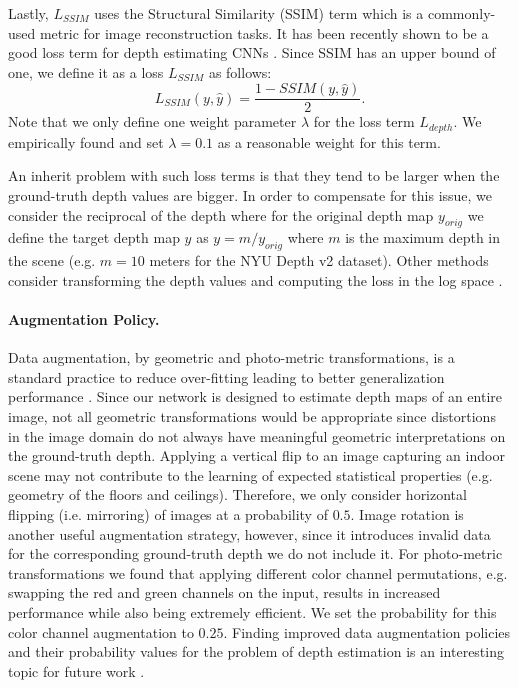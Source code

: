 \documentclass[10pt,twocolumn,letterpaper]{article}
\begin{document}
Lastly, $L_{SSIM}$ uses the Structural Similarity (SSIM) \cite{Wang2004SSIM} term which is a commonly-used metric for image reconstruction tasks. It has been recently shown to be a good loss term for depth estimating CNNs \cite{Godard2017}. Since SSIM has an upper bound of one, we define it as a loss $L_{SSIM}$ as follows:
\begin{equation}
L_{SSIM}(y,\hat{y}) = \frac{1 - SSIM(y,\hat{y})}{2}.
\end{equation}
Note that we only define one weight parameter $\lambda$ for the loss term $L_{depth}$. We empirically found and set $\lambda=0.1$ as a reasonable weight for this term. 

An inherit problem with such loss terms is that they tend to be larger when the ground-truth depth values are bigger. In order to compensate for this issue, we consider the reciprocal of the depth \cite{Ummenhofer2017, Huang2018DeepMVSLM} where for the original depth map $y_{orig}$ we define the target depth map $y$ as $y = m / y_{orig}$ where $m$ is the maximum depth in the scene (e.g. $m=10$ meters for the NYU Depth v2 dataset). Other methods consider transforming the depth values and computing the loss in the log space \cite{Eigen2014,Ummenhofer2017}.


\paragraph{Augmentation Policy.} Data augmentation, by geometric and photo-metric transformations, is a standard practice to reduce over-fitting leading to better generalization performance \cite{krizhevsky2012imagenet}.
Since our network is designed to estimate depth maps of an entire image, not all geometric transformations would be appropriate since distortions in the image domain do not always have meaningful geometric interpretations on the ground-truth depth. Applying a vertical flip to an image capturing an indoor scene may not contribute to the learning of expected statistical properties (e.g. geometry of the floors and ceilings). Therefore, we only consider horizontal flipping (i.e. mirroring) of images at a probability of $0.5$. Image rotation is another useful augmentation strategy, however, since it introduces invalid data for the corresponding ground-truth depth we do not include it. 
For photo-metric transformations we found that applying different color channel permutations, e.g. swapping the red and green channels on the input, results in increased performance while also being extremely efficient. We set the probability for this color channel augmentation to $0.25$. Finding improved data augmentation policies and their probability values for the problem of depth estimation is an interesting topic for future work \cite{Cubuk2018AutoAugmentLA}.
\end{document}
